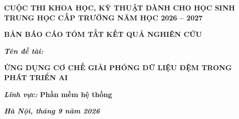 \documentclass[a4paper]{article}
\begin{document}
	
	\thispagestyle{plain}
	\begin{center}
		\bfseries
		CUỘC THI KHOA HỌC, KỸ THUẬT DÀNH CHO HỌC SINH TRUNG HỌC CẤP TRƯỜNG NĂM HỌC 2026 -- 2027
	\end{center}
	
	\vspace{5cm}
	
	\begin{center}
		\bfseries
		BẢN BÁO CÁO TÓM TẮT KẾT QUẢ NGHIÊN CỨU
	\end{center}
	
	\vspace{3cm}
	
	\begin{center}
		{\Large\bfseries\itshape Tên đề tài:}\\[10pt]
		{\Large\bfseries
		\MakeUppercase{Ứng dụng cơ chế giải phóng dữ liệu đệm trong phát triển AI}\par}
	\end{center}
	
	\vspace{3cm}
	
	\noindent\textbf{\textit{Lĩnh vực:} Phần mềm hệ thống}
	
	\vspace{6pt}
	
	\vfill
	
	\begin{center}
		\textbf{\textit{Hà Nội, tháng 9 năm 2026}}
	\end{center}
	
	\newpage
	
	\tableofcontents
	
	\listoffigures
	\listoftables
	
\end{document}
